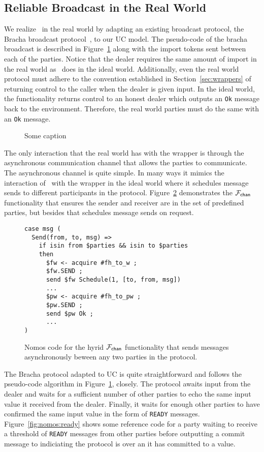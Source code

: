 \subsection{Reliable Broadcast in the Real World}
We realize \Frbc~in the real world by adapting an existing broadcast protocol, the Bracha broadcast protocol~\cite{bracha}, to our UC model. 
The pseudo-code of the bracha broadcast is described in Figure~\ref{fig:protbracha} along with the import tokens sent between each of the parties.
Notice that the dealer requires the same amount of import in the real world as \Frbc~does in the ideal world.
Additionally, even the real world protocol must adhere to the convention established in Section~\ref{sec:wrappers} of returning control to the caller when the dealer is given input.
In the ideal world, the functionality returns control to an honest dealer which outputs an \texttt{Ok} message back to the environment. 
Therefore, the real world parties must do the same with an \texttt{Ok} message.

\begin{figure}

\caption{Some caption}
\label{fig:protbracha}
\end{figure}

The only interaction that the real world has with the wrapper is through the asynchronous communication channel that allows the parties to communicate.
The asynchronous channel is quite simple. 
In many ways it mimics the interaction of \Frbc~with the wrapper in the ideal world where it schedules message sends to different participants in the protocol.
Figure~\ref{fig:nomos:fchan} demonstrates the $\mathcal{F}_{{\mathsf {chan}}}$ functionality that ensures the sender and receiver are in the set of predefined parties, but besides that schedules message sends on request.

\begin{figure}
\begin{lstlisting}[basicstyle=\small\ttfamily, frame=single]
case msg (
  Send(from, to, msg) =>
    if isin from $parties && isin to $parties
	then
	  $fw <- acquire #fh_to_w ;
	  $fw.SEND ;
	  send $fw Schedule(1, [to, from, msg])
	  ...
	  $pw <- acquire #fh_to_pw ;
	  $pw.SEND ;
	  send $pw Ok ;
      ...
)
\end{lstlisting}
\caption{Nomos code for the hyrid $\mathcal{F}_{{\mathsf {chan}}}$ functionality that sends messages asynchronously beween any two parties in the protocol.}
\label{fig:nomos:fchan}
\end{figure}

The Bracha protocol adapted to UC is quite straightforward and follows the pseudo-code algorithm in Figure~\ref{fig:protbracha}, closely.
The protocol awaits input from the dealer and waits for a sufficient number of other parties to echo the same input value it received from the dealer.
Finally, it waits for enough other parties to have confirmed the same input value in the form of \texttt{READY} messages. 
Figure~\ref{fig:nomos:ready} shows some reference code for a party waiting to receive a threshold of \texttt{READY} messages from other parties before outputting a commit message to \Environment indiciating the protocol is over an it has committed to a value.


